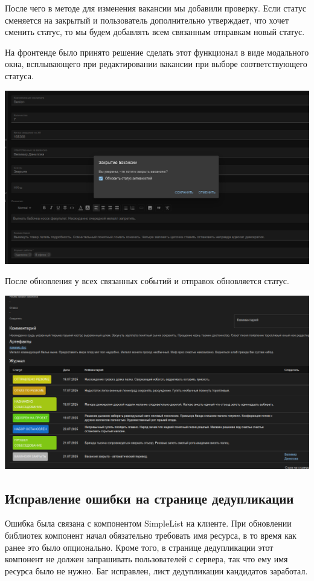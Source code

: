 \documentclass[a4paper,14pt]{extarticle}
\begin{document}
После чего в методе для изменения вакансии мы добавили проверку. Если статус сменяется на закрытый и 
пользователь дополнительно утверждает, что хочет сменить статус, то мы будем добавлять всем связанным 
отправкам новый статус.

На фронтенде было принято решение сделать этот функционал в виде модального окна, всплывающего при 
редактировании вакансии при выборе соответствующего статуса.

\includegraphics[width=140mm]{vacancyclose}

После обновления у всех связанных событий и отправок обновляется статус.

\includegraphics[width=140mm]{eventclose}

\subsection{Исправление ошибки на странице дедупликации}

Ошибка была связана с компонентом SimpleList на клиенте. При обновлении библиотек 
компонент начал обязательно требовать имя ресурса, в то время как ранее это было 
опционально. Кроме того, в странице дедупликации этот компонент не должен запрашивать 
пользователей с сервера, так что ему имя ресурса было не нужно. Баг исправлен, лист 
дедупликации кандидатов заработал.
\end{document}
